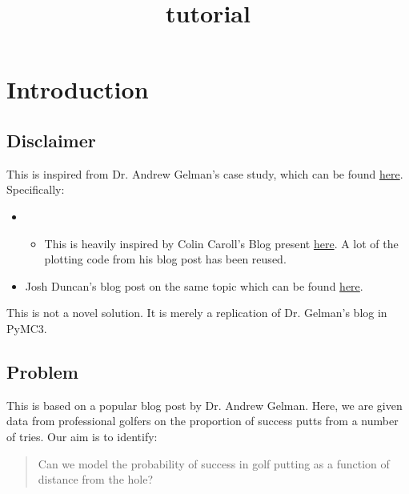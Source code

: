\documentclass[11pt]{article}
\title{tutorial}
\providecommand{\tightlist}{%
      \setlength{\itemsep}{0pt}\setlength{\parskip}{0pt}}
\begin{document}
    
    \maketitle
    
    

    
    \section{Introduction}\label{introduction}

    \subsection{Disclaimer}\label{disclaimer}

This is inspired from Dr. Andrew Gelman's case study, which can be found
\href{https://mc-stan.org/users/documentation/case-studies/golf.html}{here}.
Specifically:

\begin{itemize}
\item
  \begin{itemize}
  \tightlist
  \item
    This is heavily inspired by Colin Caroll's Blog present
    \href{https://nbviewer.jupyter.org/github/pymc-devs/pymc3/blob/master/docs/source/notebooks/putting_workflow.ipynb}{here}.
    A lot of the plotting code from his blog post has been reused.
  \end{itemize}
\item
  Josh Duncan's blog post on the same topic which can be found
  \href{https://jduncstats.com/post/2019-11-02_golf-turing/}{here}.
\end{itemize}

This is not a novel solution. It is merely a replication of Dr. Gelman's
blog in PyMC3.

    \subsection{Problem}\label{problem}

    This is based on a popular blog post by Dr. Andrew Gelman. Here, we are
given data from professional golfers on the proportion of success putts
from a number of tries. Our aim is to identify:

\begin{quote}
Can we model the probability of success in golf putting as a function of
distance from the hole?
\end{quote}
\end{document}
